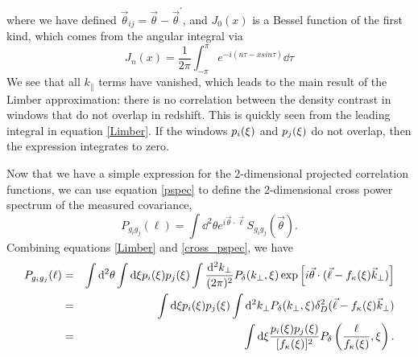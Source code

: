 where we have defined $\vec \theta_{ij} = \vec{\theta} -\vec{\theta}^\prime$, 
and $J_0(x)$ is a Bessel function of the first kind, which comes from 
the angular integral via
\begin{equation}
  \label{bessel_j}
  J_n(x) = \frac{1}{2\pi}\int_{-\pi}^{\pi} e^{-i(n\tau-x sin\tau)}\dd\tau
\end{equation}
We see that all $k_\parallel$ terms have vanished, which leads to the main
result of the Limber approximation: there is no correlation between the 
density contrast in windows that do not overlap 
in redshift. This is quickly seen from the leading integral in equation 
\ref{Limber}.  If the windows $p_i(\xi)$ and $p_j(\xi)$ do 
not overlap, then the expression integrates to zero.  

Now that we have a simple expression for the 2-dimensional projected 
correlation functions, we can use equation \ref{pspec} to define the 
2-dimensional cross power spectrum of the measured covariance,
\begin{equation} 
  \label{cross_pspec}
  P_{g_ig_j}(\ell) = \int \dd^2\theta e^{i\vec\theta\cdot\vec\ell}S_{g_ig_j}(\vec\theta).
\end{equation}
Combining equations \ref{Limber} and \ref{cross_pspec}, we have
\begin{eqnarray}
  \label{cross_pspec2}
  P_{g_ig_j}(\ell) 
  &=& \int \mathrm{d}^2\theta
  \int \mathrm{d}\xi p_i(\xi)p_j(\xi)
  \int \frac{\mathrm{d}^2k_\perp}{(2\pi)^2}
  P_\delta(k_\perp,\xi)
  \exp\left[i\vec\theta\cdot(\vec\ell- f_\kappa(\xi) 
    \vec k_\perp)\right]\nonumber\\
  &=&\int \mathrm{d}\xi p_i(\xi)p_j(\xi)\int \mathrm{d}^2k_\perp
  P_\delta(k_\perp,\xi)\delta_D^2(\vec\ell- f_\kappa(\xi)\vec k_\perp)
  \nonumber\\
  &=& \int \mathrm{d}\xi\frac{p_i(\xi)p_j(\xi)}{[f_\kappa(\xi)]^2}P_\delta\left(\frac{\ell}{f_\kappa(\xi)},\xi\right).
\end{eqnarray}

